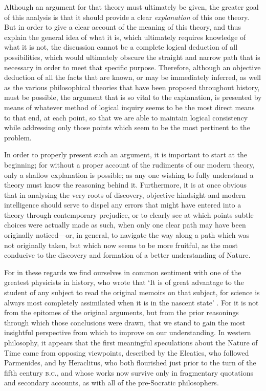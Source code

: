 Although an argument for that theory must ultimately be given, the greater goal of this analysis is that it should provide a clear \textit{explanation} of this one theory. But in order to give a clear account of the meaning of this theory, and thus explain the general idea of what it is, which ultimately requires knowledge of what it is not, the discussion cannot be a complete logical deduction of all possibilities, which would ultimately obscure the straight and narrow path that is necessary in order to meet that specific purpose. Therefore, although an objective deduction of all the facts that are known, or may be immediately inferred, as well as the various philosophical theories that have been proposed throughout history, must be possible, the argument that is so vital to the explanation, is presented by means of whatever method of logical inquiry seems to be the most direct means to that end, at each point, so that we are able to maintain logical consistency while addressing only those points which seem to be the most pertinent to the problem.

In order to properly present such an argument, it is important to start at the beginning; for without a proper account of the rudiments of our modern theory, only a shallow explanation is possible; as any one wishing to fully understand a theory must know the reasoning behind it. Furthermore, it is at once obvious that in analysing the very roots of discovery, objective hindsight and modern intelligence should serve to dispel any errors that might have entered into a theory through contemporary prejudice, or to clearly see at which points subtle choices were actually made as such, when only one clear path may have been originally noticed---or, in general, to navigate the way along a path which was not originally taken, but which now seems to be more fruitful, as the most conducive to the discovery and formation of a better understanding of Nature. 

For in these regards we find ourselves in common sentiment with one of the greatest physicists in history, who wrote that `It is of great advantage to the student of any subject to read the original memoirs on that subject, for science is always most completely assimilated when it is in the nascent state' \cite{Maxwell1892}. For it is not from the epitomes of the original arguments, but from the prior reasonings through which those conclusions were drawn, that we stand to gain the most insightful perspective from which to improve on our understanding. In western philosophy, it appears that the first meaningful speculations about the Nature of Time came from opposing viewpoints, described by the Eleatics, who followed Parmenides, and by Heraclitus, who both flourished just prior to the turn of the fifth century \textsc{b.c.}, and whose works now survive only in fragmentary quotations and secondary accounts, as with all of the pre-Socratic philosophers. 

